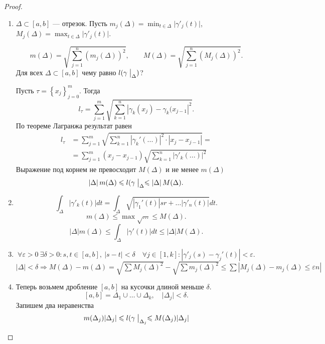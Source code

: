 \begin{proof}
    \begin{enumerate}
	\item 
    $ \Delta \subset [a, b]$ --- отрезок. Пусть $ m_j(\Delta) = \min_{t \in \Delta} \lvert \gamma'_j (t)\rvert $, $ M_j(\Delta) = \max_{t \in  \Delta} \lvert \gamma'_j(t) \rvert $.

    \[
	m(\Delta) = \sqrt{\sum_{j=1}^{n} (m_j (\Delta))^2}, \qquad
	M(\Delta) = \sqrt{\sum_{j=1}^{n} (M_j (\Delta))^2}
    .\] 
    Для всех $ \Delta \subset [a, b]$ чему равно $ l(\gamma \bigm|_{\Delta})$?

    Пусть $ \tau= \left\{ x_j \right\} ^{m}_{j=0}$. Тогда 
    \[
	l_{\tau} =  \sum_{j=1}^{m} \sqrt{\sum_{k=1}^{n}\left| \gamma_k(x_j) - \gamma_k(x_{j-1} \right|^2 }
    .\] 
    По теореме Лагранжа результат равен%
      \begin{align*}
	  l_{\tau} &=  \sum_{j=1}^{m} \sqrt{\sum_{k=1}^{n}\left| \gamma_k'(...) \right|^2 \cdot  \left| x_j - x_{j-1} \right|  } =  \\
		   &= \sum_{j=1}^{m}(x_j - x_{j-1}) \sqrt{\sum_{k=1}^{n} \left| \gamma'_k(...) \right| ^2}  
      \end{align*}
    Выражение под корнем не превосходит $ M(\Delta)$ и не менее $ m(\Delta)$
    \[
	\left| \Delta \right| m(\Delta) \le  l(\gamma\bigm|_{\Delta} \le  \left| \Delta \right| M(\Delta) 
    .\] 
\item 
    \[
	\int_{\Delta} \left| \gamma'_k (t)\right| dt = \int_{\Delta} \sqrt{\left| \gamma_1'(t)  \right| sr + \ldots \left|\gamma'_n(t)\right|} dt
    .\] 
    \[
	m(\Delta) \le  \max \sqrt {...} \le  M(\Delta)
    .\] 
    \[
	\left| \Delta \right| m(\Delta) \le \int_{\Delta} \left| \gamma'(t) \right| dt \le  \left| \Delta \right| M(\Delta) 
    .\] 
\item 
    \[
	\forall  \varepsilon >0 ~ \exists  \delta  >0: s, t \in  [a, b] , ~ \lvert s-t \rvert < \delta  \quad \forall j \in  [1, k]: \left| \gamma'_j(s) - \gamma_j'(t)  \right| < \varepsilon 
    .\] 
    $ \left| \Delta \right| < \delta  \Longrightarrow M(\Delta) - m(\Delta) = \sqrt{\sum M_j(\Delta)^2} - \sqrt{\sum m_j(\Delta)^2} \le \sum \left| M_j(\Delta) - m_j(\Delta) \le  \varepsilon  n
    \right| $
\item Теперь возьмем дробление $ [a, b]$ на кусочки длиной меньше $ \delta  $.
    \[
	[a, b] = \Delta_1 \cup \ldots \cup \Delta_k, \quad \lvert \Delta_j \rvert < \delta 
    .\] 
    Запишем два неравенства
    \[
	m(\Delta_j) \lvert \Delta_j \rvert  \le  l(\gamma \bigm|_{\Delta_j} \le M(\Delta_j) \lvert \Delta_j \rvert 
\]
\end{enumerate}
\end{proof}
